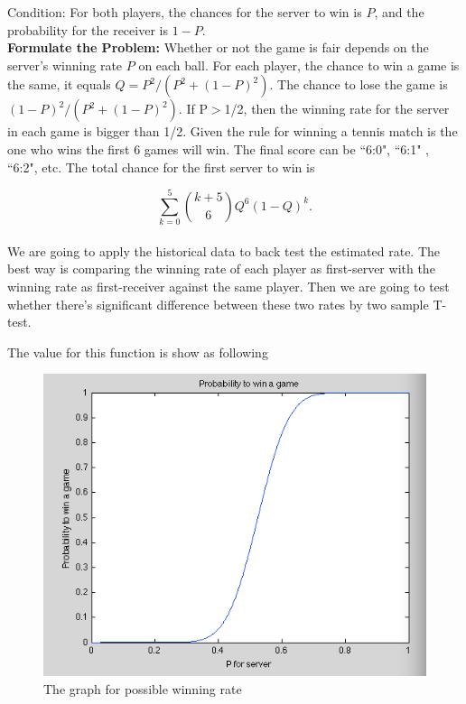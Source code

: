 \documentclass[12pt]{article}
\begin{document}
Condition: For both players, the chances for the server to win is $P$, and the probability for the receiver is $1-P$. \\

\noindent\textbf{Formulate the Problem:}  Whether or not the game is fair depends on the server's winning rate $P$ on each ball. For each player, the chance to win a game is the same, it equals $Q=P^2/(P^2+(1-P)^2)$. The chance to lose the game is $(1-P)^2/(P^2+(1-P)^2)$.  If P$>$1/2, then the winning rate for the server in each game is bigger than 1/2. Given the rule for winning a tennis match is the one who wins the first 6 games will win. The final score can be ``6:0", ``6:1" , ``6:2", etc.  The total chance for the first server to win is 

\[
 \sum_{k=0}^{5} {k+5\choose 6}{Q^6(1-Q)^k.}
\]
\\We are going to apply the historical data to back test the estimated rate. The best way is comparing the winning rate of each player as first-server with the winning rate as first-receiver against the same player. Then we are going to test whether there's significant difference between these two rates by two sample T-test.

The value for this function is show as following 

\begin{figure}[h]
    \begin{center}
        \includegraphics[scale=0.6]{graph3.png}
    \end{center}
    \caption{The graph for possible winning rate}
    \label{fig:branch}
\end{figure}
\end{document}
